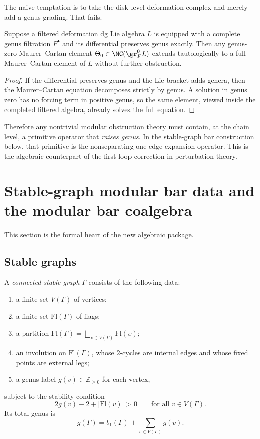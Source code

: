 The naive temptation is to take the disk-level deformation complex and merely add a
genus grading. That fails.

\begin{proposition}
Suppose a filtered deformation dg Lie algebra $L$ is equipped with a complete genus
filtration $F^\bullet$ and its differential preserves genus exactly. Then any genus-zero
Maurer--Cartan element $\Theta_0\in \MC(\gr_F^0 L)$ extends tautologically to a full
Maurer--Cartan element of $L$ without further obstruction.
\end{proposition}

\begin{proof}
If the differential preserves genus and the Lie bracket adds genera, then the Maurer--Cartan
equation decomposes strictly by genus. A solution in genus zero has no forcing term in
positive genus, so the same element, viewed inside the completed filtered algebra, already
solves the full equation.
\end{proof}

\begin{remark}
Therefore any nontrivial modular obstruction theory must contain, at the chain level,
a primitive operator that \emph{raises genus}. In the stable-graph bar construction below,
that primitive is the nonseparating one-edge expansion operator. This is the algebraic
counterpart of the first loop correction in perturbation theory.
\end{remark}

\section{Stable-graph modular bar data and the modular bar coalgebra}

This section is the formal heart of the new algebraic package.

\subsection{Stable graphs}

\begin{definition}
A \emph{connected stable graph} $\Gamma$ consists of the following data:
\begin{enumerate}[leftmargin=2.4em]
\item a finite set $V(\Gamma)$ of vertices;
\item a finite set $\mathrm{Fl}(\Gamma)$ of flags;
\item a partition $\mathrm{Fl}(\Gamma)=\bigsqcup_{v\in V(\Gamma)}\mathrm{Fl}(v)$;
\item an involution on $\mathrm{Fl}(\Gamma)$, whose $2$-cycles are internal edges and
whose fixed points are external legs;
\item a genus label $g(v)\in \mathbb Z_{\ge 0}$ for each vertex,
\end{enumerate}
subject to the stability condition
\[
2g(v)-2+|\mathrm{Fl}(v)|>0
\qquad\text{for all }v\in V(\Gamma).
\]
Its total genus is
\[
g(\Gamma)=b_1(\Gamma)+\sum_{v\in V(\Gamma)}g(v).
\]
\end{definition}

